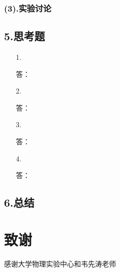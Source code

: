 \documentclass[utf8]{ctexart}
\begin{document}
	\subsubsection*{(3).实验讨论}
	
	\subsection*{5.思考题}
	\begin{itemize}
		\item [1.]
		\item [ ]答：
		\item [2.]
		\item [ ]答：
		\item [3.]
		\item [ ]答：
		\item [4.]
		\item [ ]答：
	\end{itemize}
	
	
	\subsection*{6.总结}
	
	\section*{致谢}
	
	\begin{center}
		感谢\cite{bk1}大学物理实验中心和韦先涛老师
	\end{center}
	
	
	
	\label{unknown}
\end{document}
